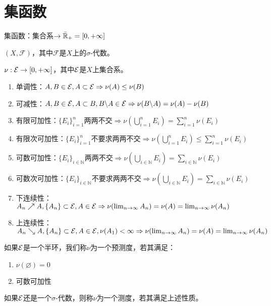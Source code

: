 \documentclass{ctexbook}
\begin{document}
\section{集函数}
\begin{Def}
  集函数：集合系$\to \bar{\mathbb{R}}_{+}=[0,+\infty]$
\end{Def}

\begin{Def}[可测空间]
  $(X,\mathscr{F})$，其中$\mathscr{F}$是$X$上的$\sigma$-代数。
\end{Def}

\begin{Def}
  $\nu:\mathcal{E}\to [0,+\infty]$，其中$\mathcal{E}$是$X$上集合系。
  \begin{enumerate}
  \item 单调性：$A,B\in\mathcal{E},A\subset \mathcal{E}\Rightarrow \nu(A)\leq \nu(B)$
  \item 可减性：$A,B\in \mathcal{E},A\subset B,B\backslash A\in \mathcal{E}\Rightarrow \nu(B\backslash A)=\nu(A)-\nu(B)$
  \item 有限可加性：$\{E_{i}\}_{i=1}^{n}$两两不交$\Rightarrow \nu(\bigcup_{i=1}^{n}E_{i})=\sum_{i=1}^{n}\nu(E_{i})$
  \item 有限次可加性：$\{E_{i}\}_{i=1}^{n}$不要求两两不交$\Rightarrow \nu(\bigcup_{i=1}^{n}E_{i})\leq\sum_{i=1}^{n}\nu(E_{i})$
 
  \item 可数可加性：$\{E_{i}\}_{i\in\mathbb{N}}$两两不交$\Rightarrow \nu(\bigcup_{i\in\mathbb{N}}E_{i})=\sum_{i\in\mathbb{N}}\nu(E_{i})$
  \item 可数次可加性：$\{E_{i}\}_{i\in\mathbb{N}}$不要求两两不交$\Rightarrow \nu(\bigcup_{i\in\mathbb{N}}E_{i})=\sum_{i\in\mathbb{N}}\nu(E_{i})$
  \item 下连续性：$A_{n}\nearrow A,\{A_{n}\}\subset \mathcal{E},A\in\mathcal{E}\Rightarrow \nu(\lim_{n\to\infty} A_{n})=\nu(A)=\lim_{n\to\infty}\nu(A_{n})$
  \item 上连续性：$A_{n}\searrow A,\{A_{n}\}\subset \mathcal{E},A\in\mathcal{E},\nu(A_{1})<\infty\Rightarrow \nu(\lim_{n\to\infty} A_{n})=\nu(A)=\lim_{n\to\infty}\nu(A_{n})$
  \end{enumerate}
如果$\mathcal{E}$是一个半环，我们称$\nu$为一个预测度，若其满足：
\begin{enumerate}
\item $\nu(\varnothing)=0$
\item 可数可加性
\end{enumerate}
如果$\mathcal{E}$还是一个$\sigma$-代数，则称$\nu$为一个测度，若其满足上述性质。
\end{Def}
\end{document}
